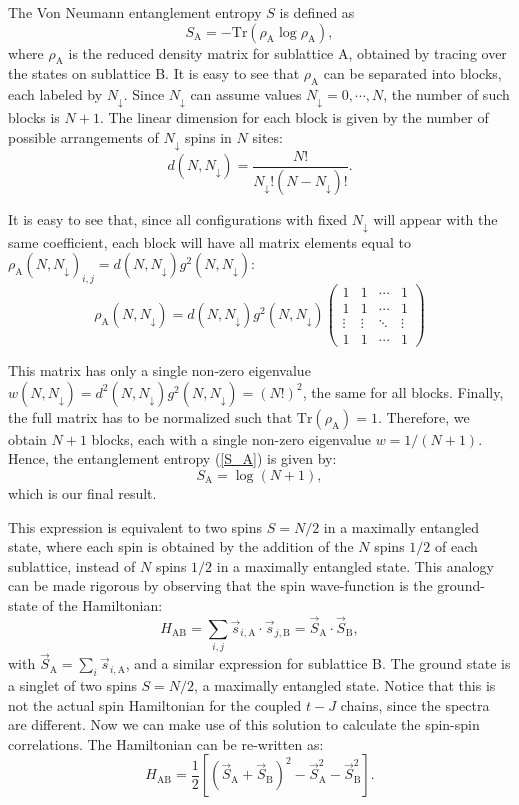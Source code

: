 \documentclass[article,11pt]{revtex4}
\begin{document}
The Von Neumann entanglement entropy $S$ is defined as
\begin{equation}
S_\mathrm{A}=-\mathrm{Tr}\left( \rho_\mathrm{A}\log{\rho_\mathrm{A}} \right),
\label{S_A}
\end{equation}
where $\rho_\mathrm{A}$ is the reduced density matrix for sublattice A, obtained by tracing over the states on sublattice B.
It is easy to see that $\rho_\mathrm{A}$ can be separated into blocks, each labeled by $N_\downarrow$. Since $N_\downarrow$ can assume values $N_\downarrow=0,\cdots,N$, the number of such blocks is $N+1$. The linear dimension for each block is given by the number of possible arrangements of $N_\downarrow$ spins in $N$ sites:
\[
d(N,N_\downarrow)=\frac{N!}{N_\downarrow ! (N-N_\downarrow)!}.
\]

It is easy to see that, since all configurations with fixed $N_\downarrow$ will appear with the same coefficient, each block will have all matrix elements equal to $\rho_\mathrm{A}(N,N_\downarrow)_{i,j}=d(N,N_\downarrow) g^2(N,N_\downarrow)$:
\begin{equation}
\rho_\mathrm{A}(N,N_\downarrow)=d(N,N_\downarrow) g^2(N,N_\downarrow)
\left(
\begin{array}{cccc}
1 & 1 & \cdots & 1 \\
1 & 1 & \cdots & 1 \\
\vdots & \vdots & \ddots & \vdots \\
1 & 1 & \cdots & 1
\end{array}
\right)
\end{equation}

This matrix has only a single non-zero eigenvalue $w(N,N_\downarrow)=d^2(N,N_\downarrow)g^2(N,N_\downarrow)=(N!)^2$, the same for all blocks.
Finally, the full matrix has to be normalized such that $\mathrm{Tr}(\rho_\mathrm{A})=1$. Therefore, we obtain $N+1$ blocks, each with a single non-zero eigenvalue $w=1/(N+1)$. Hence, the entanglement entropy (\ref{S_A}) is given by:
\[
S_\mathrm{A}=\log{(N+1)},
\]
which is our final result. 

This expression is equivalent to two spins $S=N/2$ in a maximally entangled state, where each spin is obtained by the addition of the $N$ spins $1/2$ of each sublattice, instead of $N$ spins $1/2$ in a maximally entangled state. 
This analogy can be made rigorous by observing that the spin wave-function is the ground-state of the Hamiltonian:
\[
H_\mathrm{AB}=\sum_{i,j} \vec{s}_{i,\mathrm{A}}\cdot \vec{s}_{j,\mathrm{B}} = \vec{S}_\mathrm{A} \cdot \vec{S}_\mathrm{B},
\]
with $\vec{S}_\mathrm{A} = \sum_i \vec{s}_{i,\mathrm{A}}$, and a similar expression for sublattice B. The ground state is a singlet of two spins $S=N/2$, a maximally entangled state. Notice that this is not the actual spin Hamiltonian for the coupled $t-J$ chains, since the spectra are different. Now we can make use of this solution to calculate the spin-spin correlations. The Hamiltonian can be re-written as:
\[
H_\mathrm{AB}=\frac{1}{2}\left[(\vec{S}_\mathrm{A}+\vec{S}_\mathrm{B})^2-\vec{S}_\mathrm{A}^2-\vec{S}_\mathrm{B}^2 \right].
\]
\end{document}
